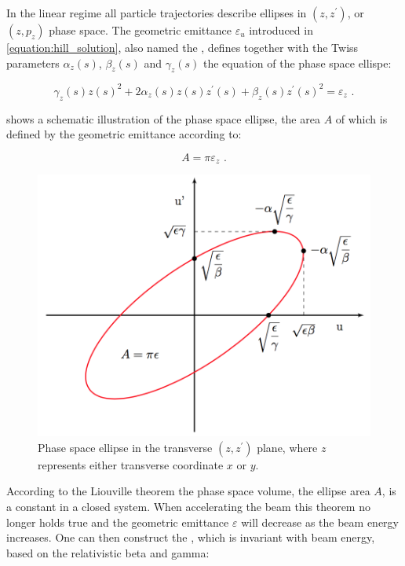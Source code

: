 In the linear regime all particle trajectories describe ellipses in \((z, z^{\prime})\), or \((z, p_z)\) phase space.
The geometric emittance \(\varepsilon_u\) introduced in \cref{equation:hill_solution}, also named the , defines together with the Twiss parameters \(\alpha_z(s)\), \(\beta_z(s)\) and \(\gamma_z(s)\) the equation of the phase space ellispe:

\begin{equation}
    \gamma_z(s) z(s)^{2} + 2 \alpha_z(s) z(s) z^{\prime}(s) + \beta_z(s) z^{\prime}(s)^{2} = \varepsilon_z \text{ .}
    \label{equation:ellipse_equation}
\end{equation}

 shows a schematic illustration of the phase space ellipse, the area \(A\) of which is defined by the geometric emittance according to:

\begin{equation}
    A = \pi \varepsilon_z \text{ .}
    \label{equation:phase_space_ellipse_area}
\end{equation}

\begin{figure}[!htb]
    \centering
    \includegraphics[width = 0.75\linewidth]{Figures/Beam_Dynamics_Theory/phase_space.png}
    \caption{Phase space ellipse in the transverse \((z, z^{\prime})\) plane, where \(z\) represents either transverse coordinate \(x\) or \(y\).}
    \label{figure:phase_space_ellipse}
\end{figure}

According to the Liouville theorem the phase space volume, the ellipse area \(A\), is a constant in a closed system.
When accelerating the beam this theorem no longer holds true and the geometric emittance \(\varepsilon\) will decrease as the beam energy increases.
One can then construct the , which is invariant with beam energy, based on the relativistic beta and gamma:


